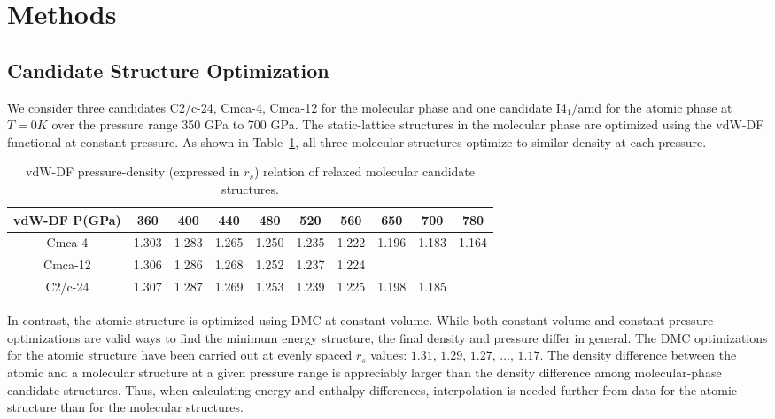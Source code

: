 \section{Methods}
\label{sec:hsolid-methods}

\subsection{Candidate Structure Optimization}
We consider three candidates C2/c-24, Cmca-4, Cmca-12 for the molecular phase and one candidate I4$_1$/amd for the atomic phase at $T=0K$ over the pressure range 350 GPa to 700 GPa. The static-lattice structures in the molecular phase are optimized using the vdW-DF functional at constant pressure.
As shown in Table~\ref{tab:hsolid-mol-press-rs}, all three molecular structures optimize to similar density at each pressure.
\begin{table}[h]
\centering
\begin{tabular}{cccccccccc}
\toprule
vdW-DF P(GPa) & 360 & 400 & 440 & 480 & 520 & 560 & 650 & 700 & 780 \\
\midrule
Cmca-4  & 1.303 & 1.283 & 1.265 & 1.250 & 1.235 & 1.222 & 1.196 & 1.183 & 1.164 \\
Cmca-12 & 1.306 & 1.286 & 1.268 & 1.252 & 1.237 & 1.224 & & & \\
C2/c-24 & 1.307 & 1.287 & 1.269 & 1.253 & 1.239 & 1.225 & 1.198 & 1.185 & \\
\bottomrule
\end{tabular}
\caption{vdW-DF pressure-density (expressed in $r_s$) relation of relaxed molecular candidate structures.}
\label{tab:hsolid-mol-press-rs}
\end{table}
In contrast, the atomic structure is optimized using DMC at constant volume.
While both constant-volume and constant-pressure optimizations are valid ways to find the minimum energy structure, the final density and pressure differ in general.
The DMC optimizations for the atomic structure have been carried out at evenly spaced $r_s$ values: $1.31$, $1.29$, $1.27$, $\dots$, $1.17$.
The density difference between the atomic and a molecular structure at a given pressure range is appreciably larger than the density difference among molecular-phase candidate structures.
Thus, when calculating energy and enthalpy differences, interpolation is needed further from data for the atomic structure than for the molecular structures.

